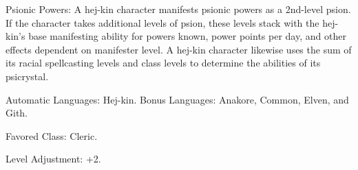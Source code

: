 \begin{itemize*}
    \item Psionic Powers: A hej-kin character manifests psionic powers as a 2nd-level psion. If the character takes additional levels of psion, these levels stack with the hej-kin's base manifesting ability for powers known, power points per day, and other effects dependent on manifester level. A hej-kin character likewise uses the sum of its racial spellcasting levels and class levels to determine the abilities of its psicrystal.

    \item Automatic Languages: Hej-kin. Bonus Languages: Anakore, Common, Elven, and Gith.
    \item Favored Class: Cleric.
    \item Level Adjustment: +2.
\end{itemize*}
